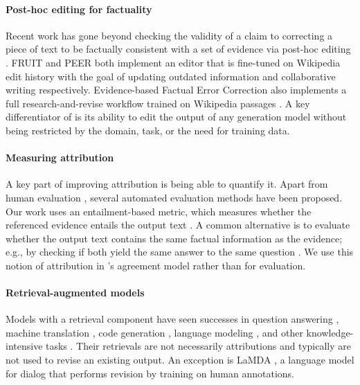 \documentclass[11pt]{article}
\begin{document}
\paragraph{Post-hoc editing for factuality}
Recent work has gone beyond checking the validity of a claim to correcting a piece of text to be factually consistent with a set of evidence via post-hoc editing \cite{shah2020automatic,thorne2021evidence,schuster2021get, Balachandran2022CorrectingDF, Cao2020FactualEC, Iso2020FactbasedTE}.
FRUIT \cite{LoganIV2022FRUIT} and PEER \cite{Schick2022PEER} both implement an editor that is fine-tuned on Wikipedia edit history with the goal of updating outdated information and collaborative writing respectively.
Evidence-based Factual Error Correction \cite[EFEC;][]{thorne2021evidence} also implements a full research-and-revise workflow trained on Wikipedia passages \cite{thorne2018fever}.
A key differentiator of \approach{} is its ability to edit the output of any generation model without being restricted by the domain, task, or the need for training data.

\paragraph{Measuring attribution}
A key part of improving attribution is being able to quantify it.
Apart from human evaluation \cite{Rashkin2021AIS},
several automated evaluation methods have been proposed.
Our work uses an entailment-based metric,
which measures whether the referenced evidence entails the output text \cite{Bohnet2022AttributedQA, Kryscinski2020EvaluatingTF,Goyal2021AnnotatingAM}.
A common alternative is to evaluate whether the output text contains the same factual information as the evidence; e.g., by checking if both yield the same answer to the same question \cite{Wang2020AskingAA}. We use this notion of attribution in \approach{}'s agreement model rather than for evaluation. 

\paragraph{Retrieval-augmented models}
Models with a retrieval component have seen successes in question answering \cite{chen2017reading,lee2019latent,nakano2021webgpt}, machine translation \cite{zhang2018guiding}, code generation \cite{hayati2018retrieval}, language modeling \cite{khandelwal2019generalization}, and other knowledge-intensive tasks \cite{lewis2020rag}.
Their retrievals are not necessarily attributions \cite{dziri2022origin,longpre2021entity}
and typically are not used to revise an existing output.
An exception is LaMDA \cite{Thoppilan2022LaMDA}, a language model for dialog that performs revision by training on human annotations.
\end{document}
